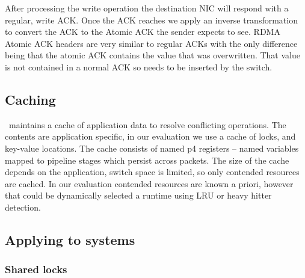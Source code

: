 
After processing the write operation the destination NIC will respond
with a regular, write ACK. Once the ACK reaches {\sword} we apply an
inverse transformation to convert the ACK to the Atomic ACK the sender
expects to see.  RDMA Atomic ACK headers are very similar to regular
ACKs with the only difference being that the atomic ACK contains the
value that was overwritten. That value is not contained in a normal
ACK so needs to be inserted by the switch. 

\subsection{Caching}

\sword\ maintains a cache of application data to resolve
conflicting operations. The contents are application
specific, in our evaluation we use a cache of locks, and
key-value locations. The cache consists of named p4
registers -- named variables mapped to pipeline stages which
persist across packets. The size of the cache depends on the
application, switch space is limited, so only contended
resources are cached. In our evaluation contended resources
are known a priori, however that could be dynamically
selected a runtime using LRU or heavy hitter detection.



\subsection{Applying to systems}

\subsubsection{Shared locks}
\label{sec:locking-algorithm}

